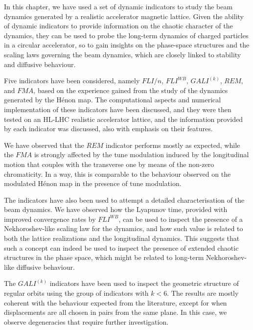 In this chapter, we have used a set of dynamic indicators to study the beam dynamics generated by a realistic accelerator magnetic lattice. Given the ability of dynamic indicators to provide information on the chaotic character of the dynamics, they can be used to probe the long-term dynamics of charged particles in a circular accelerator, so to gain insights on the phase-space structures and the scaling laws governing the beam dynamics, which are closely linked to stability and diffusive behaviour.

Five indicators have been considered, namely $FLI/n$, $FLI^{WB}$, $GALI^{(k)}$, $REM$, and $FMA$, based on the experience gained from the study of the dynamics generated by the H\'enon map. The computational aspects and numerical implementation of these indicators have been discussed, and they were then tested on an HL-LHC realistic accelerator lattice, and the information provided by each indicator was discussed, also with emphasis on their features.

We have observed that the $REM$ indicator performs mostly as expected, while the $FMA$ is strongly affected by the tune modulation induced by the longitudinal motion that couples with the transverse one by means of the non-zero chromaticity. In a way, this is comparable to the behaviour observed on the modulated Hénon map in the presence of tune modulation. 

The indicators have also been used to attempt a detailed characterisation of the beam dynamics. We have observed how the Lyapunov time, provided with improved convergence rates by $FLI^{WB}$, can be used to inspect the presence of a Nekhoroshev-like scaling law for the dynamics, and how such value is related to both the lattice realizations and the longitudinal dynamics. This suggests that such a concept can indeed be used to inspect the presence of extended chaotic structures in the phase space, which might be related to long-term Nekhoroshev-like diffusive behaviour.

The $GALI^{(k)}$ indicators have been used to inspect the geometric structure of regular orbits using the group of indicators with $k < 6$. The results are mostly coherent with the behaviour expected from the literature, except for when displacements are all chosen in pairs from the same plane. In this case, we observe degeneracies that require further investigation.
